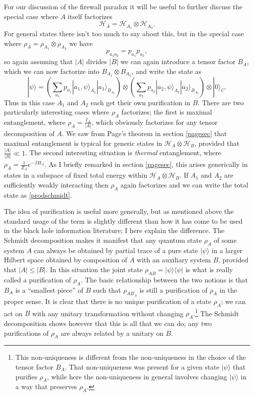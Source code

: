 \documentclass[12pt]{article}
\newcommand{\be}{\begin{equation}}
\newcommand{\ee}{\end{equation}}
\newcommand{\HA}{\mathcal{H}_A}
\newcommand{\HB}{\mathcal{H}_B}
\newcommand{\lan}{\langle}
\newcommand{\ran}{\rangle}
\begin{document}
For our discussion of the firewall paradox it will be useful to further discuss the special case where $A$ itself factorizes
\be
\HA=\mathcal{H}_{A_1}\otimes \mathcal{H}_{A_2}.
\ee
For general states there isn't too much to say about this, but in the special case where $\rho_A=\rho_{A_1}\otimes \rho_{A_2}$ we have
\be
p_{a_1a_2}=p_{a_1}p_{a_2},
\ee
so again assuming that $|A|$ divides $|B|$ we can again introduce a tensor factor $B_A$, which we can now factorize into $B_{A_1}\otimes B_{A_2}$, and write the state as
\be\label{prodschmidt}
|\psi\ran=\left(\sum_{a_1}p_{a_1}|a_1,\psi\ran_{A_1}|a_1\ran_{B_{A_1}}\right)\otimes\left(\sum_{a_2}p_{a_2}|a_2,\psi\ran_{A_2}|a_2\ran_{B_{A_2}}\right)\otimes |0\ran_C.
\ee
Thus in this case $A_1$ and $A_2$ each get their own purification in $B$.  There are two particularly interesting cases where $\rho_A$ factorizes; the first is maximal entanglement, where $\rho_A=\frac{I_A}{|A|}$, which obviously factorizes for any tensor decomposition of $A$.  We saw from Page's theorem in section \ref{pagesec} that maximal entanglement is typical for generic states in $\HA\otimes \HB$, provided that $\frac{|A|}{|B|}\ll 1$.  The second interesting situation is \textit{thermal} entanglement, where $\rho_A=\frac{1}{Z_A}e^{-\beta H_A}$.  As I briefly remarked in section \ref{pagesec}, this arises generically in states in a subspace of fixed total energy within $\HA\otimes \HB$.  If $A_1$ and $A_2$ are sufficiently weakly interacting then $\rho_A$ again factorizes and we can write the total state as \eqref{prodschmidt}.

The idea of purification is useful more generally, but as mentioned above the standard usage of the term is slightly different than how it has come to be used in the black hole information literature; I here explain the difference.  The Schmidt decomposition makes it manifest that any quantum state $\rho_A$ of some system $A$ can always be obtained by partial trace of a pure state $|\psi\ran$ in a larger Hilbert space obtained by composition of $A$ with an auxiliary system $B$, provided that $|A|\leq |B|$.  In this situation the joint state $\rho_{AB}=|\psi\ran\lan \psi|$ is what is really called a purification of $\rho_A$.  The basic relationship between the two notions is that $B_A$ is a ``smallest piece'' of $B$ such that $\rho_{AB_A}$ is still a purification of $\rho_A$ in the proper sense.  It is clear that there is no unique purification of a state $\rho_A$; we can act on $B$ with any unitary transformation without changing $\rho_A$.\footnote{This non-uniqueness is different from the non-uniqueness in the choice of the tensor factor $B_A$. That non-uniqueness was present for a given state $|\psi\ran$ that purifies $\rho_A$, while here the non-uniqueness in general involves changing $|\psi\ran$ in a way that preserves $\rho_A$.}  The Schmidt decomposition shows however that this is all that we can do; any two purifications of $\rho_A$  are always related by a unitary on $B$.  
\end{document}
